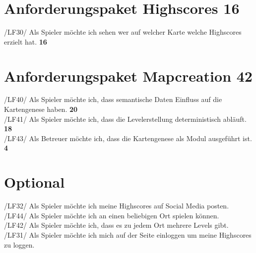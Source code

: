 \documentclass[11pt,a4paper]{article}
\begin{document}
\section{Anforderungspaket Highscores 16}
/LF30/ Als Spieler möchte ich sehen wer auf welcher Karte welche \noindent\hspace*{13mm} Highscores erzielt hat. \textbf{16}
\section{Anforderungspaket Mapcreation 42}
/LF40/ Als Spieler möchte ich, dass semantische Daten Einfluss auf die \noindent\hspace*{13mm} Kartengenese haben. \textbf{20}\\
/LF41/ Als Spieler möchte ich, dass die Levelerstellung deterministisch \noindent\hspace*{13mm} abläuft. \textbf{18}\\
/LF43/ Als Betreuer möchte ich, dass die Kartengenese als Modul \noindent\hspace*{13mm} ausgeführt ist. \textbf{4}
\section{Optional}
/LF32/ Als Spieler möchte ich meine Highscores auf Social Media posten.\\
/LF44/ Als Spieler möchte ich an einen beliebigen Ort spielen können.\\
/LF42/ Als Spieler möchte ich, dass es zu jedem Ort mehrere Levels gibt.\\
/LF31/ Als Spieler möchte ich mich auf der Seite einloggen um meine \noindent\hspace*{13mm} Highscores zu loggen.
\end{document}
